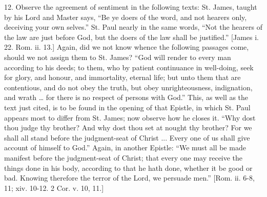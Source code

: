 12. Observe the agreement of sentiment in the following texts: St.
James, taught by his Lord and Master says, ``Be ye doers of the
word, and not hearers only, deceiving your own selves.'' St. Paul
nearly in the same words, ``Not the hearers of the law are just
before God, but the doers of the law shall be justified.'' [James i.
22. Rom. ii. 13.] Again, did we not know whence the following passages
come, should we not assign them to St. James? ``God will render to
every man according to his deeds; to them, who by patient continuance in
well-doing, seek for glory, and honour, and immortality, eternal life;
but unto them that are contentious, and do not obey the truth, but obey
unrighteousness, indignation, and wrath … for there is no respect of
persons with God.'' This, as well as the text just cited, is to be
found in the opening of that Epistle, in which St. Paul appears most to
differ from St. James; now observe how he closes it. ``Why dost thou
judge thy brother? And why dost thou set at nought thy brother? For we
shall all stand before the judgment-seat of Christ ... Every one of us
shall give account of himself to God.'' Again, in another Epistle:
``We must all be made manifest before the judgment-seat of Christ;
that every one may receive the things done in his body, according to
that he hath done, whether it be good or bad. Knowing therefore the
terror of the Lord, we persuade men.'' [Rom. ii. 6-8, 11; xiv.
10-12. 2 Cor. v. 10, 11.]


